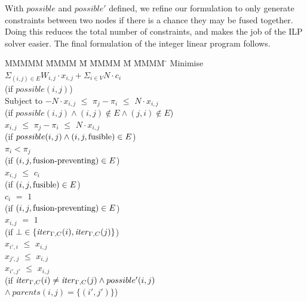 With $possible$ and $possible'$ defined, we refine our formulation to only generate constraints between two nodes if there is a chance they may be fused together. Doing this reduces the total number of constraints, and makes the job of the ILP solver easier. The final formulation of the integer linear program follows.
%
\begin{tabbing}
MMMMM   \= MMMM \= M \= MMMM \= M \= MMMM \= \kill
Minimise   \> $\Sigma_{(i,j) \in E} W_{i,j} \cdot x_{i,j} + \Sigma_{i \in V} N \cdot c_i$  \\
           \> (if $possible(i,j)$)         
\\[0.5ex]
Subject to \> $-N \cdot x_{i,j}$ \> $\le$ \> $\pi_j - \pi_i$ \> $\le$ \> $N \cdot x_{i,j}$ \\
           \> (if $possible(i,j) \wedge (i,j) \not\in E \wedge (j,i) \not\in E$)            
\\[0.5ex]
           \>    $x_{i,j}$ \> $\le$ \> $\pi_j - \pi_i$ \> $\le$ \> $N \cdot x_{i,j}$ \\
           \> (if $possible(i,j) \wedge (i,j,\mathrm{fusible}) \in E$)     
\\[0.5ex]
           \>             \>       \> $\pi_i < \pi_j$ \>       \>            \\
           \> (if $(i,j,\mbox{fusion-preventing}) \in E$)    
\\[0.5ex]
           \> $x_{i,j}$    \> $\le$ \> $c_i$           \>       \>            \\
           \> (if $(i,j, \mathrm{fusible}) \in E$) \\
           \> $c_{i }$    \> $ = $ \> $ 1 $           \>       \>            \\
           \> (if $(i,j, \mbox{fusion-preventing}) \in E$)
\\[0.5ex]
           \> $x_{i,j}$    \> $=$   \> $1$             \>       \>            \\
           \> (if $\bot \in \{\mathit{iter}_{\Gamma,C}(i), \mathit{iter}_{\Gamma,C}(j)\}$)  
\\[0.5ex]
           \> $x_{i',i}$   \> $\le$ \> $x_{i,j}$        \>       \>            \\
           \> $x_{j',j}$   \> $\le$ \> $x_{i,j}$        \>       \>            \\
           \> $x_{i',j'}$   \> $\le$ \> $x_{i,j}$        \>       \>            \\
           \> (if $\mathit{iter}_{\Gamma,C}(i) \not= \mathit{iter}_{\Gamma,C}(j) \wedge possible'(i,j)$ \\
           \> \> $\wedge~parents(i,j) = \{(i',j')\}$) 

\end{tabbing}
